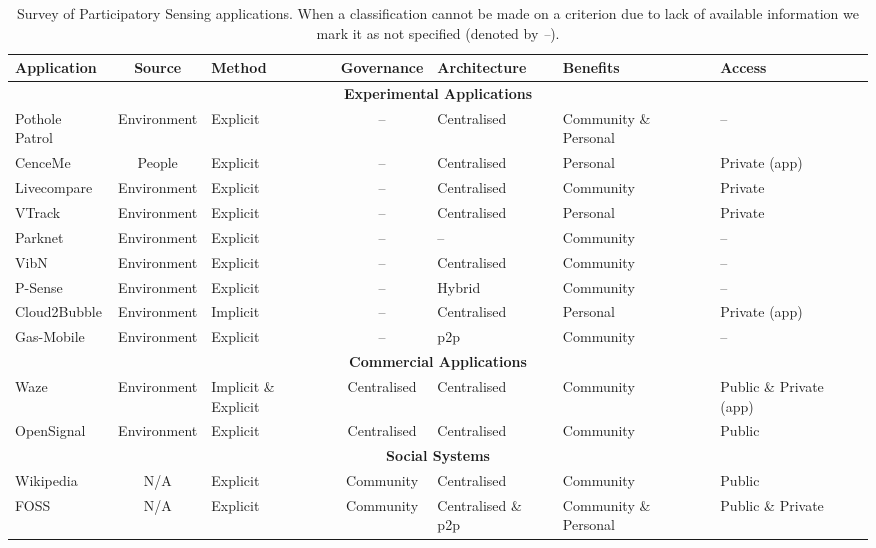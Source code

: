 \begin{table}
\centering
\caption[Survey of Participatory Sensing applications]{Survey of Participatory Sensing applications. When a classification cannot be made on a criterion due to lack of available information we mark it as not specified (denoted by \emph{--}).\label{table:litsurvey}}
\begin{tabularx}{\textwidth}{X|c|p{2.0cm}|c|p{2.1cm}|p{2.6cm}|p{2.3cm}}
\textbf{Application} & \textbf{Source} & \textbf{Method} & \textbf{Governance} & \textbf{Architecture} & \textbf{Benefits} & \textbf{Access} \\ \hline \hline
\multicolumn{7}{c}{\textbf{Experimental Applications}} \\
\hline 
Pothole Patrol \citep{Eriksson2008} & Environment & Explicit & -- & Centralised & Community \& Personal & -- \\
CenceMe \citep{Miluzzo2008} & People & Explicit & -- & Centralised & Personal & Private (app) \\
Livecompare \citep{Deng2009} & Environment & Explicit & -- & Centralised & Community & Private \\
VTrack \citep{Thiagarajan2009} & Environment & Explicit & -- & Centralised & Personal & Private \\
Parknet \citep{Mathur2010} & Environment & Explicit & -- & -- & Community & -- \\
VibN \citep{Miluzzo2011} & Environment & Explicit & -- & Centralised & Community & -- \\
P-Sense \citep{Mendez2011} & Environment & Explicit & -- & Hybrid & Community & -- \\
Cloud2Bubble \citep{Costa2012} & Environment & Implicit & -- & Centralised & Personal & Private (app) \\
Gas-Mobile \citep{Hasenfratz2012} & Environment & Explicit & -- & p2p & Community & -- \\

\hline \hline
\multicolumn{7}{c}{\textbf{Commercial Applications}} \\\hline
Waze & Environment & Implicit \& Explicit & Centralised & Centralised & Community & Public \& \newline Private (app) \\
OpenSignal & Environment & Explicit & Centralised & Centralised & Community & Public \\

\hline \hline
\multicolumn{7}{c}{\textbf{Social Systems}} \\\hline
Wikipedia & N/A & Explicit & Community & Centralised & Community & Public \\
\acl{FOSS} & N/A & Explicit & Community & Centralised \& p2p & Community \& Personal & Public \& \newline Private
\end{tabularx}
\end{table}

